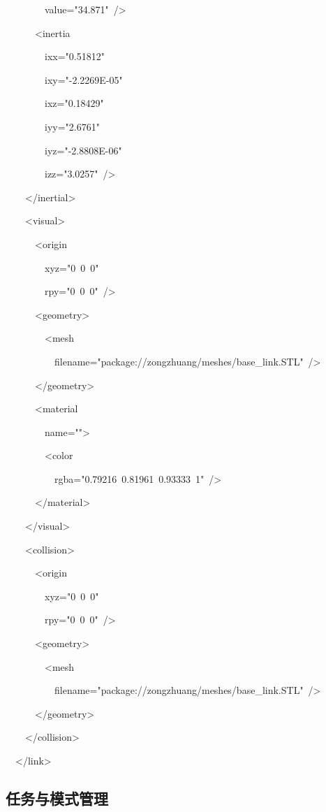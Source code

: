 \documentclass[UTF8,a4paper,12pt]{ctexart}
\begin{document}
~~~~~~~~value="34.871"~/\textgreater{}

~~~~~~\textless inertia

~~~~~~~~ixx="0.51812"

~~~~~~~~ixy="-2.2269E-05"

~~~~~~~~ixz="0.18429"

~~~~~~~~iyy="2.6761"

~~~~~~~~iyz="-2.8808E-06"

~~~~~~~~izz="3.0257"~/\textgreater{}

~~~~\textless/inertial\textgreater{}

~~~~\textless visual\textgreater{}

~~~~~~\textless origin

~~~~~~~~xyz="0~0~0"

~~~~~~~~rpy="0~0~0"~/\textgreater{}

~~~~~~\textless geometry\textgreater{}

~~~~~~~~\textless mesh

~~~~~~~~~~filename="package://zongzhuang/meshes/base\_link.STL"~/\textgreater{}

~~~~~~\textless/geometry\textgreater{}

~~~~~~\textless material

~~~~~~~~name=""\textgreater{}

~~~~~~~~\textless color

~~~~~~~~~~rgba="0.79216~0.81961~0.93333~1"~/\textgreater{}

~~~~~~\textless/material\textgreater{}

~~~~\textless/visual\textgreater{}

~~~~\textless collision\textgreater{}

~~~~~~\textless origin

~~~~~~~~xyz="0~0~0"

~~~~~~~~rpy="0~0~0"~/\textgreater{}

~~~~~~\textless geometry\textgreater{}

~~~~~~~~\textless mesh

~~~~~~~~~~filename="package://zongzhuang/meshes/base\_link.STL"~/\textgreater{}

~~~~~~\textless/geometry\textgreater{}

~~~~\textless/collision\textgreater{}

~~\textless/link\textgreater{}

\subsection{任务与模式管理}\label{_Toc228997223}
\end{document}
